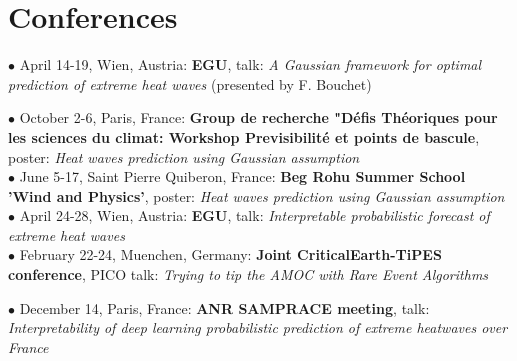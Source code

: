 \documentclass[11pt, a4 paper]{article}
\newcommand{\bu}{$\bullet$ }
\begin{document}
\section*{Conferences}
  \begin{description}[style=multiline,leftmargin=3cm,align=right]
    \item[2024]
      \bu April 14-19, Wien, Austria: \textbf{EGU}, talk: \emph{A Gaussian framework for optimal prediction of extreme heat waves} (presented by F. Bouchet) \cite{mascoloGaussianFrameworkOptimal2024a}
    \item[2023]
      \bu October 2-6, Paris, France: \textbf{Group de recherche "Défis Théoriques pour les sciences du climat: Workshop Previsibilité et points de bascule}, poster: \emph{Heat waves prediction using Gaussian assumption} \\
      \bu June 5-17, Saint Pierre Quiberon, France: \textbf{Beg Rohu Summer School 'Wind and Physics'}, poster: \emph{Heat waves prediction using Gaussian assumption} \\
      \bu April 24-28, Wien, Austria: \textbf{EGU}, talk: \emph{Interpretable probabilistic forecast of extreme heat waves} \cite{lovoInterpretableProbabilisticForecast2023} \\
      \bu February 22-24, Muenchen, Germany: \textbf{Joint CriticalEarth-TiPES conference}, PICO talk: \emph{Trying to tip the AMOC with Rare Event Algorithms}
    \item[2022]
      \bu December 14, Paris, France: \textbf{ANR SAMPRACE meeting}, talk: \emph{Interpretability of deep learning probabilistic prediction of extreme heatwaves over France}
  \end{description}
\end{document}
